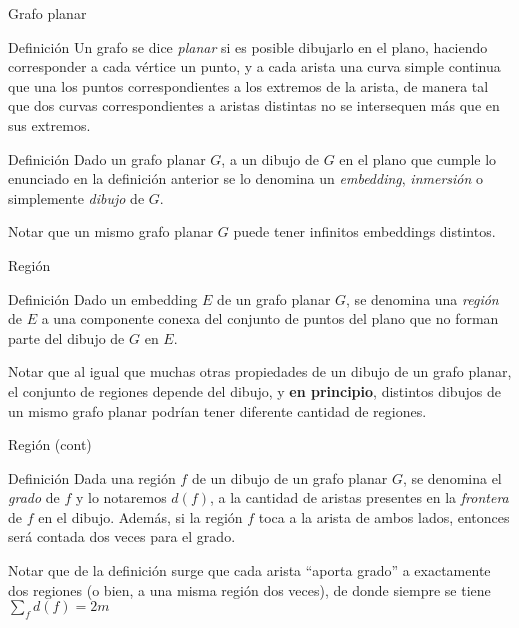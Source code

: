 \documentclass[compress]{beamer}
\begin{document}
\begin{frame}{Grafo planar}

\begin{block}{Definición}
    Un grafo se dice \textit{planar} si es posible dibujarlo en el plano, haciendo corresponder a cada vértice un punto, y a cada arista una curva simple continua que una los puntos correspondientes a los extremos de la arista, de manera tal que dos curvas correspondientes a aristas distintas no se intersequen más que en sus extremos.
\end{block}

\begin{block}{Definición}
    Dado un grafo planar $G$, a un dibujo de $G$ en el plano que cumple lo enunciado en la definición anterior se lo denomina un \textit{embedding}, \textit{inmersión} o simplemente \textit{dibujo} de $G$.
\end{block}

Notar que un mismo grafo planar $G$ puede tener infinitos embeddings distintos.

\end{frame}

\begin{frame}{Región}

\begin{block}{Definición}
    Dado un embedding $E$ de un grafo planar $G$, se denomina una \textit{región} de $E$ a una componente conexa del conjunto de puntos del plano que no forman parte del dibujo de $G$ en $E$.
\end{block}

Notar que al igual que muchas otras propiedades de un dibujo de un grafo planar, el conjunto de regiones depende del dibujo, y \textbf{en principio}, distintos dibujos de un mismo grafo planar podrían tener diferente cantidad de regiones.

\end{frame}

\begin{frame}{Región (cont)}

\begin{block}{Definición}
    Dada una región $f$ de un dibujo de un grafo planar $G$, se denomina el \textit{grado} de $f$ y lo notaremos $d(f)$, a la cantidad de aristas presentes en la \textit{frontera} de $f$ en el dibujo. Además, si la región $f$ toca
    a la arista de ambos lados, entonces será contada dos veces para el grado.
\end{block}

Notar que de la definición surge que cada arista ``aporta grado'' a exactamente dos regiones (o bien, a una misma región dos veces), de donde siempre se tiene $\sum_f {d(f)} = 2m$

\end{frame}
\end{document}

